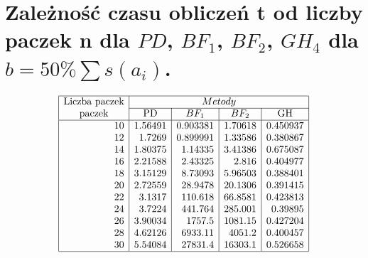 \documentclass[polish,polish,a4paper]{article}
\begin{document}
\begin{spacing}{1.25}
\begin{figure}[H]
	\end{figure}
	
	
\section{Zależność czasu obliczeń t od liczby paczek n dla $PD$, $BF_{1}$, $BF_{2}$, $GH_{4}$ dla $b = 50 \% \sum s (a_{i})$. }
	
		\begin{spacing}{1.5}
		\begin{equation*}
		\begin{array}{|r|r|r|r|r|}
		\hline
		\multicolumn{1}{|c|}{$Liczba paczek$}&	\multicolumn{4}{c|}{Metody}\\\cline{2-5}
		\multicolumn{1}{|c|}{$paczek$}
		&\multicolumn{1}{c|}{$PD$}
		&\multicolumn{1}{c|}{$$BF_{1}$$}
		&\multicolumn{1}{c|}{$$BF_{2}$$}
		&\multicolumn{1}{c|}{$GH$}
		\\\hline
		10&1.56491&0.903381&1.70618&0.450937\\
		12&1.7269&0.899991&1.33586&0.380867\\
		14&1.80375&1.14335&3.41386&0.675087\\
		16&2.21588&2.43325&2.816&0.404977\\
		18&3.15129&8.73093&5.96503&0.388401\\
		20&2.72559&28.9478&20.1306&0.391415\\
		22&3.1317&110.618&66.8581&0.423813\\
		24&3.7224&441.764&285.001&0.39895\\
		26&3.90034&1757.5&1081.15&0.427204\\
		28&4.62126&6933.11&4051.2&0.400457\\
		30&5.54084&27831.4&16303.1&0.526658\\
		\hline
		\end{array}
		\end{equation*}
	\end{spacing}
	

\end{spacing}
\end{document}
